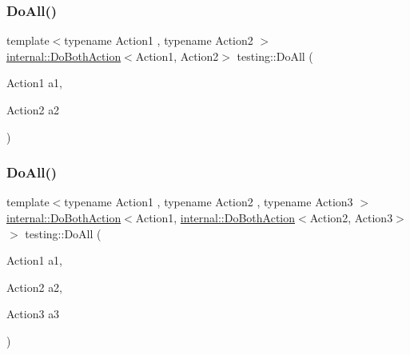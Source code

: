 \mbox{\label{namespacetesting_a5f533932753d2af95000e96c4a3042e3}} 
\subsubsection{\texorpdfstring{Do\+All()}{DoAll()}\hspace{0.1cm}{\footnotesize\ttfamily [1/9]}}
{\footnotesize\ttfamily template$<$typename Action1 , typename Action2 $>$ \\
\hyperlink{classtesting_1_1internal_1_1_do_both_action}{internal\+::\+Do\+Both\+Action}$<$Action1, Action2$>$ testing\+::\+Do\+All (\begin{DoxyParamCaption}\item[{Action1}]{a1,  }\item[{Action2}]{a2 }\end{DoxyParamCaption})\hspace{0.3cm}{\ttfamily [inline]}}

\mbox{\label{namespacetesting_ad6a3ce5e229120ea287286a86394d712}} 
\subsubsection{\texorpdfstring{Do\+All()}{DoAll()}\hspace{0.1cm}{\footnotesize\ttfamily [2/9]}}
{\footnotesize\ttfamily template$<$typename Action1 , typename Action2 , typename Action3 $>$ \\
\hyperlink{classtesting_1_1internal_1_1_do_both_action}{internal\+::\+Do\+Both\+Action}$<$Action1, \hyperlink{classtesting_1_1internal_1_1_do_both_action}{internal\+::\+Do\+Both\+Action}$<$Action2, Action3$>$ $>$ testing\+::\+Do\+All (\begin{DoxyParamCaption}\item[{Action1}]{a1,  }\item[{Action2}]{a2,  }\item[{Action3}]{a3 }\end{DoxyParamCaption})\hspace{0.3cm}{\ttfamily [inline]}}

\mbox{\label{namespacetesting_a790ce08c80a1f8ececa0f2a4f678247c}} 
